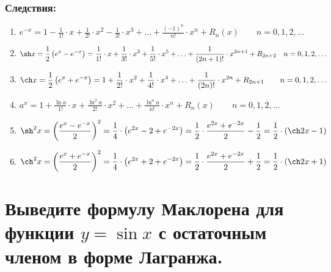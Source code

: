 	\subsubsection*{Следствия:}
	\begin{enumerate}
		\item $\displaystyle{e^{-x} = 1 - \frac{1}{1!}\cdot x + \frac{1}{2!}\cdot x^2	- \frac{1}{3!}\cdot x^3 + \ldots + \frac{(-1)^n}{n!}\cdot x^n + R_n(x) \qquad n=0, 1, 2, \ldots}$
		\item $\displaystyle{ \sh x = \frac{1}{2}\left(e^x - e^{-x}\right) = \frac{1}{1!}\cdot x + \frac{1}{3!}\cdot x^3 + \frac{1}{5!}\cdot x^5 + \ldots + \frac{1}{(2n+1)!}\cdot x^{2n+1} + R_{2n+2}\quad n=0, 1, 2, \ldots}$
		\item $\displaystyle \ch x = \frac{1}{2}\left(e^x+ e^{-x}\right) = 1 + \frac{1}{2!}\cdot x^2 + \frac{1}{4!}\cdot x^4 + \ldots + \frac{1}{(2n)!}\cdot x^{2n} + R_{2n+1} \qquad n=0,1,2, \ldots$
		\item $\displaystyle a^x = 1+\frac{\ln a}{1!}\cdot x + \frac{\ln^2a}{2!}\cdot x^2 + \ldots + \frac{\ln^n a}{n!}\cdot x^n + R_n(x)\qquad n=0, 1, 2,\ldots$
		\item $\displaystyle \sh^2 x = \left(\frac{e^x - e^{-x}}{2}\right)^2 = \frac{1}{4}\cdot \left(e^{2x} - 2 + e^{-2x}\right)  = \frac{1}{2}\cdot \frac{e^{2x} + e^{-2x}}{2} - \frac{1}{2} = \frac{1}{2}\cdot (\ch 2x - 1) $
		\item $\displaystyle \ch^2 x = \left(\frac{e^x + e^{-x}}{2}\right)^2 = \frac{1}{4}\cdot \left(e^{2x}+ 2 + e^{-2x}\right) = \frac{1}{2} \cdot \frac{e^{2x} + e^{-2x}}{2} + \frac{1}{2} = \frac{1}{2}\cdot \left(\ch 2x + 1\right) $
	\end{enumerate}

\section{Выведите формулу Маклорена для функции $y = \sin x$ с остаточным членом в форме Лагранжа.}

